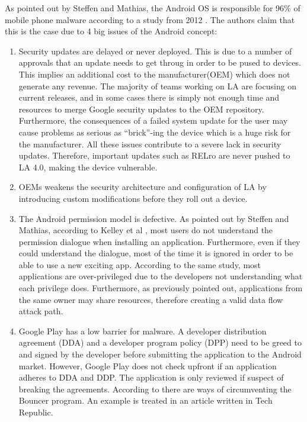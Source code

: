 As pointed out by Steffen and Mathias, the Android OS is responsible for 96\% of mobile phone malware according to a study from 2012 \cite{}. The authors claim that this is the case due to 4 big issues of the Android concept:
\begin{enumerate}
	\item Security updates are delayed or never deployed. This is due to a number of approvals that an update needs to get throug in order to be pused to devices. This implies an additional cost to the manufacturer(OEM) which does not generate any revenue. The majority of teams working on LA are focusing on current releases, and in some cases there is simply not enough time and resources to merge Google security updates to the OEM repository. Furthermore, the consequences of a failed system update for the user may cause problems as serious as ``brick''-ing the device which is a huge risk for the manufacturer. All these issues contribute to a severe lack in security updates. Therefore, important updates such as RELro are never pushed to LA 4.0, making the device vulnerable.
	
	\item OEMs weakens the security architecture and configuration of LA by introducing custom modifications before they roll out a device.
	
	\item The Android permission model is defective. As pointed out by Steffen and Mathias, according to Kelley et al \cite{kelley2012conundrum}, most users do not understand the permission dialogue when installing an application. Furthermore, even if they could understand the dialogue, most of the time it is ignored in order to be able to use a new exciting app. According to the same study, most applications are over-privileged due to the developers not understanding what each privilege does. Furthermore, as previously pointed out, applications from the same owner may share resources, therefore creating a valid data flow attack path. 
	
	\item Google Play has a low barrier for malware. A developer distribution agreement (DDA) and a developer program policy (DPP) need to be greed to and signed by the developer before submitting the application to the Android market. However, Google Play does not check upfront if an application adheres to DDA and DDP. The application is only reviewed if suspect of breaking the agreements. According to \cite{percoco2012adventures} there are ways of circumventing the Bouncer program. An example is treated in an article \cite{} written in Tech Republic.
\end{enumerate}

